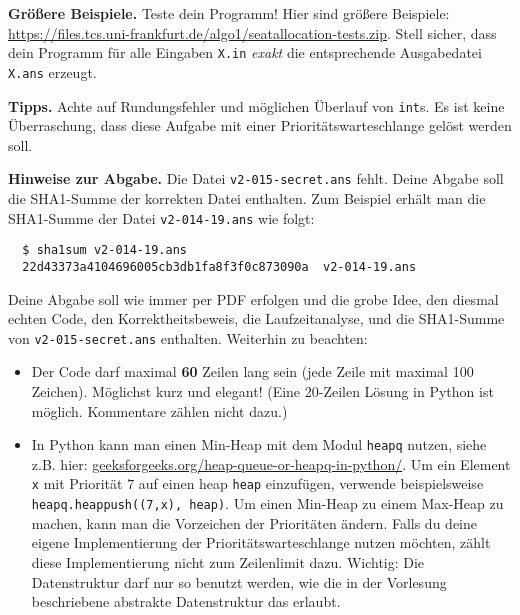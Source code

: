 \documentclass{uebung_cs}
\begin{document}
\begin{aufgabe}
  \textbf{Größere Beispiele.}
  Teste dein Programm! Hier sind größere Beispiele:
  \url{https://files.tcs.uni-frankfurt.de/algo1/seatallocation-tests.zip}.  
  Stell sicher, dass dein Programm für alle Eingaben \texttt{X.in} \emph{exakt} die entsprechende Ausgabedatei \texttt{X.ans} erzeugt.
  
  \textbf{Tipps.}
  Achte auf Rundungsfehler und möglichen Überlauf von \texttt{int}s.
	Es ist keine Überraschung, dass diese Aufgabe mit einer Prioritätswarteschlange gelöst werden soll.
  
  \textbf{Hinweise zur Abgabe.}
  Die Datei \texttt{v2-015-secret.ans} fehlt.
  Deine Abgabe soll die SHA1-Summe der korrekten Datei enthalten.
  Zum Beispiel erhält man die SHA1-Summe der Datei \texttt{v2-014-19.ans} wie folgt:
  \begin{verbatim}
  $ sha1sum v2-014-19.ans 
  22d43373a4104696005cb3db1fa8f3f0c873090a  v2-014-19.ans
  \end{verbatim}
  Deine Abgabe soll wie immer per PDF erfolgen und die grobe Idee, den diesmal echten Code, den Korrektheitsbeweis, die Laufzeitanalyse, und die SHA1-Summe von \texttt{v2-015-secret.ans} enthalten.
  Weiterhin zu beachten:
  \begin{itemize}
  \item Der Code darf maximal \textbf{60} Zeilen lang sein (jede Zeile mit maximal 100 Zeichen). Möglichst kurz und elegant! (Eine 20-Zeilen Lösung in Python ist möglich. Kommentare zählen nicht dazu.)
  \item In Python kann man einen Min-Heap mit dem Modul \texttt{heapq} nutzen, siehe z.B. hier: \href{https://www.geeksforgeeks.org/heap-queue-or-heapq-in-python/}{geeksforgeeks.org/heap-queue-or-heapq-in-python/}. Um ein Element \texttt{x} mit Priorität $7$ auf einen heap \texttt{heap} einzufügen, verwende beispielsweise \texttt{heapq.heappush((7,x), heap)}. Um einen Min-Heap zu einem Max-Heap zu machen, kann man die Vorzeichen der Prioritäten ändern. Falls du deine eigene Implementierung der Prioritätswarteschlange nutzen möchten, zählt diese Implementierung nicht zum Zeilenlimit dazu. Wichtig: Die Datenstruktur darf nur so benutzt werden, wie die in der Vorlesung beschriebene abstrakte Datenstruktur das erlaubt.
  \end{itemize}

\end{aufgabe}
\end{document}

